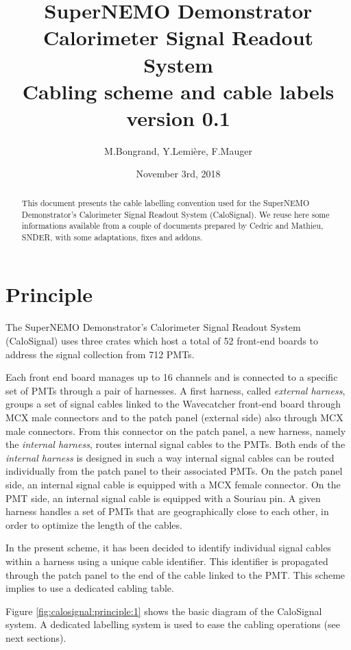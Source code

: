 \documentclass[12pt,a4paper]{article}
\title{SuperNEMO Demonstrator\\
  Calorimeter Signal Readout System\\
  Cabling scheme and cable labels\\
  version 0.1}
\author{M.Bongrand, Y.Lemi\`ere, F.Mauger}
\date{November 3rd, 2018}
\begin{document}
\maketitle

\begin{abstract}
  \noindent This document presents the cable labelling convention used
  for  the SuperNEMO  Demonstrator's Calorimeter Signal Readout  System
  (CaloSignal).  We reuse  here some informations available  from a couple
  of documents prepared  by Cedric and Mathieu, SNDER,  with some adaptations,
  fixes and addons.
\end{abstract}

\tableofcontents
\vfill

\clearpage
\section{Principle}

The  SuperNEMO   Demonstrator's  Calorimeter  Signal   Readout  System
(CaloSignal)  uses three  crates which  host a  total of  52 front-end
boards to address the signal collection from 712 PMTs.

Each front end board  manages up to 16 channels and  is connected to a
specific set  of PMTs through a  pair of harnesses.  A  first harness,
called \emph{external harness}, groups a set of signal cables linked
to the Wavecatcher front-end board through MCX male connectors and to
the patch  panel (external side) also through MCX male connectors.
From this connector  on the patch
panel,  a  new harness,  namely  the  \emph{internal harness},  routes
internal signal cables to the PMTs.  Both ends of the \emph{internal harness} is
designed in  such a  way internal signal cables  can be  routed individually  from the
patch panel to their
associated PMTs. On the patch panel side, an internal signal cable is equipped with
a MCX female connector. On the PMT side,  an internal signal cable is equipped with
a Souriau pin. 
A  given harness  handles a set of PMTs
that are geographically close to each  other, in order to optimize the
length of the cables.

In  the present  scheme, it  has been  decided to  identify individual
signal cables within a harness using a unique cable identifier.
This identifier is
propagated through the patch panel to the
end  of the  cable linked  to the  PMT.
This scheme implies to use a dedicated cabling table.

\noindent\par Figure \ref{fig:calosignal:principle:1}  shows the basic
diagram of the CaloSignal system. A dedicated labelling system is
used to ease the cabling operations (see next sections).
\end{document}
